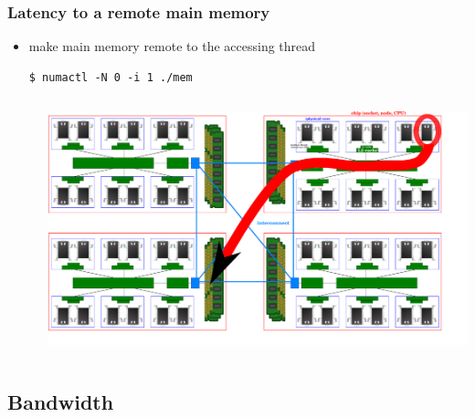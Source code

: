 \documentclass[12pt,dvipdfmx]{beamer}
\begin{document}
\begin{frame}[fragile]
\frametitle{Latency to a remote main memory}
\begin{itemize}
\item make main memory remote to the accessing thread
\begin{lstlisting}
$ numactl -N 0 -i 1 ./mem
\end{lstlisting} %
\begin{columns}
\begin{column}{0.75\textwidth}
{\scriptsize}
\end{column}
\begin{column}{0.25\textwidth}
\includegraphics[width=\textwidth]{out/pdf/svg/diagram_multisocket_remote.pdf}
\end{column}
\end{columns}
\end{itemize}
\end{frame}

\subsection{Bandwidth}
\end{document}
